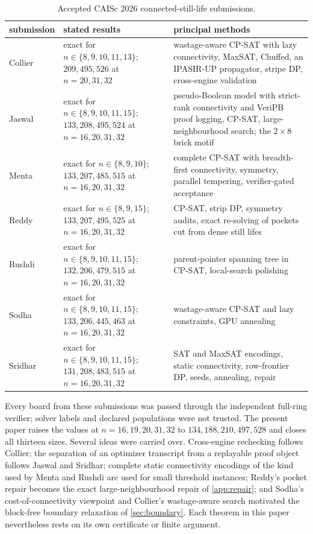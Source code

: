 \documentclass[10pt]{article}
\theoremstyle{remark}
\begin{document}
\begin{table}[h]
\centering
\caption{Accepted CAISc 2026 connected-still-life submissions.}
\label{tab:caisc-submissions}
\scriptsize
\begin{tabularx}{\textwidth}{@{}>{\raggedright\arraybackslash}p{}>{\raggedright\arraybackslash}p{}X@{}}
\toprule
submission & stated results & principal methods\\
\midrule
Collier~\cite{caisc-collier} & exact for $n\in\{8,9,10,11,13\}$; $209,495,526$ at $n=20,31,32$ & wastage-aware CP-SAT with lazy connectivity, MaxSAT, Chuffed, an IPASIR-UP propagator, stripe DP, cross-engine validation\\
Jaswal~\cite{caisc-jaswal} & exact for $n\in\{8,9,10,11,15\}$; $133,208,495,524$ at $n=16,20,31,32$ & pseudo-Boolean model with strict-rank connectivity and VeriPB proof logging, CP-SAT, large-neighbourhood search; the $2\times8$ brick motif\\
Menta~\cite{caisc-menta} & exact for $n\in\{8,9,10\}$; $133,207,485,515$ at $n=16,20,31,32$ & complete CP-SAT with breadth-first connectivity, symmetry, parallel tempering, verifier-gated acceptance\\
Reddy~\cite{caisc-reddy} & exact for $n\in\{8,9,15\}$; $133,207,495,525$ at $n=16,20,31,32$ & CP-SAT, strip DP, symmetry audits, exact re-solving of pockets cut from dense still lifes\\
Rushdi~\cite{caisc-rushdi} & exact for $n\in\{8,9,10,11,15\}$; $132,206,479,515$ at $n=16,20,31,32$ & parent-pointer spanning tree in CP-SAT, local-search polishing\\
Sodha~\cite{caisc-sodha} & exact for $n\in\{8,9,10,11,15\}$; $133,206,445,463$ at $n=16,20,31,32$ & wastage-aware CP-SAT and lazy constraints, GPU annealing\\
Sridhar~\cite{caisc-sridhar} & exact for $n\in\{8,9,10,11,15\}$; $131,208,483,515$ at $n=16,20,31,32$ & SAT and MaxSAT encodings, static connectivity, row-frontier DP, seeds, annealing, repair\\
\bottomrule
\end{tabularx}
\end{table}

Every board from these submissions was passed through the independent
full-ring verifier; solver labels and declared populations were not trusted.
The present paper raises the values at $n=16,19,20,31,32$ to
$134,188,210,497,528$ and closes all thirteen sizes.  Several ideas were carried
over.  Cross-engine rechecking follows Collier; the separation of an optimizer
transcript from a replayable proof object follows Jaswal and Sridhar; complete
static connectivity encodings of the kind used by Menta and Rushdi are used for
small threshold instances; Reddy's pocket repair becomes the exact
large-neighbourhood repair of \cref{app:repair}; and Sodha's cost-of-connectivity
viewpoint and Collier's wastage-aware search motivated the block-free boundary
relaxation of \cref{sec:boundary}.  Each theorem in this paper nevertheless rests
on its own certificate or finite argument.
\end{document}
